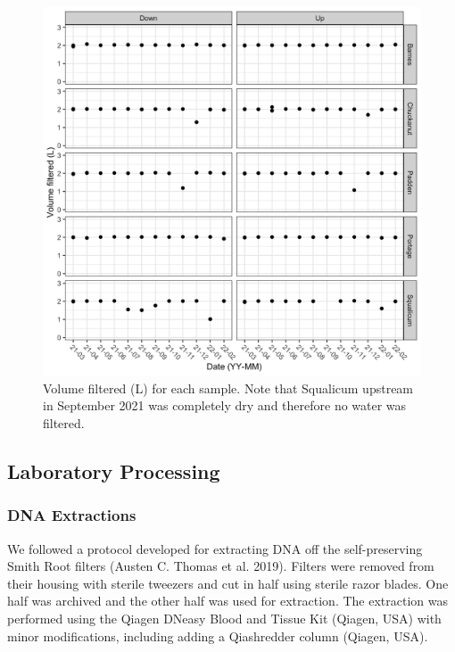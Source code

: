 \documentclass[
]{article}
\begin{document}
\begin{figure}
\centering
\includegraphics{../Output/SupplementalFigures/volume_filtered_by_sample.png}
\caption{Volume filtered (L) for each sample. Note that Squalicum
upstream in September 2021 was completely dry and therefore no water was
filtered.}
\end{figure}

\hypertarget{laboratory-processing}{%
\subsection{Laboratory Processing}\label{laboratory-processing}}

\hypertarget{dna-extractions}{%
\subsubsection{DNA Extractions}\label{dna-extractions}}

We followed a protocol developed for extracting DNA off the
self-preserving Smith Root filters (Austen C. Thomas et al. 2019).
Filters were removed from their housing with sterile tweezers and cut in
half using sterile razor blades. One half was archived and the other
half was used for extraction. The extraction was performed using the
Qiagen DNeasy Blood and Tissue Kit (Qiagen, USA) with minor
modifications, including adding a Qiashredder column (Qiagen, USA).
\end{document}
